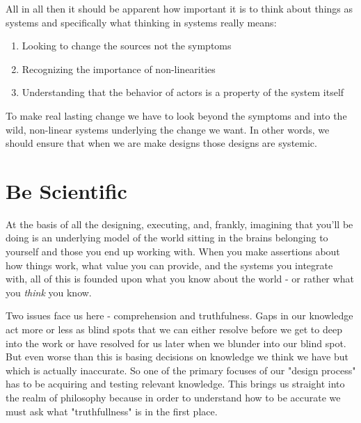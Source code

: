 \documentclass[11pt,a5paper]{book}
\begin{document}
All in all then it should be apparent how important it is to think about things as systems and specifically what thinking in systems really means:

\begin{enumerate}
\item Looking to change the sources not the symptoms
\item Recognizing the importance of non-linearities
\item Understanding that the behavior of actors is a property of the system itself
\end{enumerate}

To make real lasting change we have to look beyond the symptoms and into the wild, non-linear systems underlying the change we want. In other words, we should ensure that when we are make designs those designs are systemic.  

\section{Be Scientific}
At the basis of all the designing, executing, and, frankly, imagining that you'll be doing is an underlying model of the world sitting in the brains belonging to yourself and those you end up working with. When you make assertions about how things work, what value you can provide, and the systems you integrate with, all of this is founded upon what you know about the world - or rather what you \textit{think} you know. 
\newline

Two issues face us here - comprehension and truthfulness. Gaps in our knowledge act more or less as blind spots that we can either resolve before we get to deep into the work or have resolved for us later when we blunder into our blind spot. But even worse than this is basing decisions on knowledge we think we have but which is actually inaccurate. So one of the primary focuses of our "design process" has to be acquiring and testing relevant knowledge. This brings us straight into the realm of philosophy because in order to understand how to be accurate we must ask what "truthfullness" is in the first place.
\end{document}
